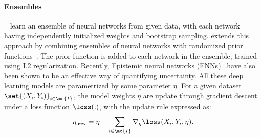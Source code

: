 \paragraph{Ensembles}\ensembles~\citep{LakshminarayananPrBl17}  learn an ensemble of neural networks from given data, with each network having independently initialized weights and bootstrap sampling. 
\ensembleplus\citep{OsbandAsCa18} extends this approach by combining ensembles of neural networks with randomized prior functions~\citep{OsbandVa15}. The prior function is added to each network in the ensemble, trained using L2 regularization. Recently,  
Epistemic neural networks (ENNs)~\citep{OsbandWenAsDwIbLuRo23} have also been shown to be an effective way of quantifying uncertainty. All these deep learning models are parametrized by some parameter $\eta$. For a given dataset $\set{(X_i,Y_i)}_{i \in \mc{I}}$, the model weights $\eta$ are update through gradient descent under a loss function $\loss(.)$, with the update rule expressed as: 
\begin{align}
    \eta_{\rm new} = \eta - 
    \sum_{i \in \mc{I}} \nabla_{\eta} \loss( X_i,Y_i,\eta). \label{eqn:ENN-update-naive}
\end{align}
    









